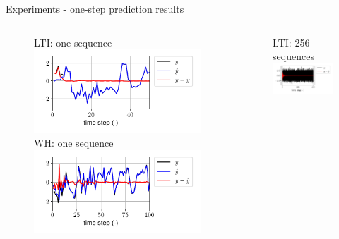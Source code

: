 \documentclass{beamer}
\begin{document}
\begin{frame}{Experiments - one-step prediction results}
\begin{columns}[t]
\begin{center}
\begin{figure}
LTI: one sequence
\includegraphics[width=\textwidth]{fig/lin_one_step_single.pdf}
WH: one sequence
\includegraphics[width=\textwidth]{fig/wh_one_step_single.pdf} 
\end{figure}
\end{center}
\begin{center}
\begin{figure}
LTI: 256 sequences
\includegraphics[width=\textwidth]{fig/lin_one_step_batch.pdf} 

\end{figure}
\end{center}
\end{columns}
\end{frame}
\end{document}
